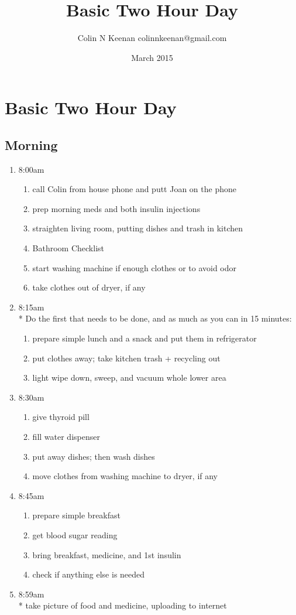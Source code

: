 \documentclass[12pt,letterpaper]{article}
\newcommand{\mytitle}{Basic Two Hour Day}
\begin{document}
\title{\mytitle{}}
\author{Colin N Keenan colinnkeenan@gmail.com}
\date{March 2015}
\section*{\mytitle{}}
\begin{multicols}{2} 
\subsection*{Morning}
\begin{enumerate}
	\item 8:00am
		\begin{enumerate}
			\item call Colin from house phone and putt Joan on the phone
			\item prep morning meds and both insulin injections
			\item straighten living room, putting dishes and trash in kitchen
			\item Bathroom Checklist
			\item start washing machine if enough clothes or to avoid odor
			\item take clothes out of dryer, if any
		\end{enumerate}
	\item 8:15am \\*
		Do the first that needs to be done, and as much as you can in 15 minutes:
		\begin{enumerate}
			\item prepare simple lunch and a snack and put them in refrigerator
			\item put clothes away; take kitchen trash + recycling out
			\item light wipe down, sweep, and vacuum whole lower area
		\end{enumerate}
	\item 8:30am
		\begin{enumerate}
			\item give thyroid pill
			\item fill water dispenser
			\item put away dishes; then wash dishes
			\item move clothes from washing machine to dryer, if any
		\end{enumerate}
	\item 8:45am
		\begin{enumerate}
			\item prepare simple breakfast
			\item get blood sugar reading
			\item bring breakfast, medicine, and 1st insulin
			\item check if anything else is needed
		\end{enumerate}
	\item 8:59am \\*
		take picture of food and medicine, uploading to internet
\end{enumerate}


\end{multicols}
\end{document}

